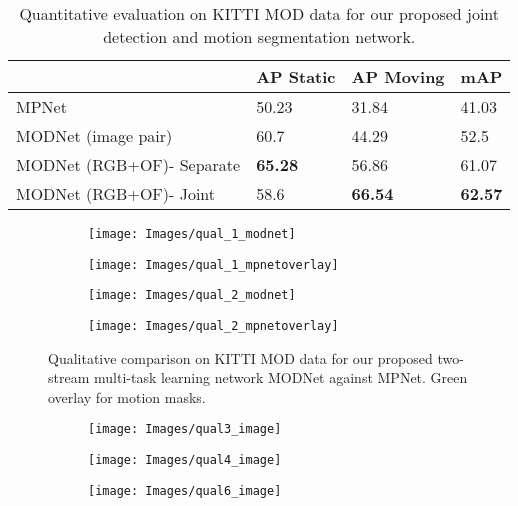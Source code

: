 \documentclass[letterpaper, 10 pt, conference]{ieeeconf}  %
\begin{document}
\begin{table}[ht!]
\centering
\caption{Quantitative evaluation on KITTI MOD data for our proposed joint detection and motion segmentation network.}
\begin{tabular}{|l|l|l|l|}
\hline
 & AP Static & AP Moving & mAP \\ \hline
MPNet\cite{tokmakov2016learning} & 50.23 & 31.84 & 41.03 \\ \hline
MODNet (image pair) & 60.7 & 44.29 & 52.5\\ \hline
MODNet (RGB+OF)- Separate& \textbf{65.28} & 56.86 & 61.07 \\ \hline
MODNet (RGB+OF)- Joint& 58.6 & \textbf{66.54} & \textbf{62.57} \\ \hline
\end{tabular}
\label{table:quant_det}
\end{table}\begin{figure*}[ht!]
\centering
\begin{subfigure}{.48\textwidth}
    \texttt{[image: Images/qual\_1\_modnet]}
\end{subfigure}%
\begin{subfigure}{.48\textwidth}
    \texttt{[image: Images/qual\_1\_mpnetoverlay]}
\end{subfigure}

\begin{subfigure}{.48\textwidth}
    \texttt{[image: Images/qual\_2\_modnet]}
\end{subfigure}%
\begin{subfigure}{.48\textwidth}
    \texttt{[image: Images/qual\_2\_mpnetoverlay]}
\end{subfigure}
    \caption{Qualitative comparison on KITTI MOD data for our proposed two-stream multi-task learning network MODNet against MPNet. Green overlay for motion masks.}
    \label{fig:qual_comp}
\end{figure*}\begin{figure*}[ht!]
\centering
\begin{subfigure}{.3\textwidth}
    \texttt{[image: Images/qual3\_image]}
\end{subfigure}%
\begin{subfigure}{.3\textwidth}
    \texttt{[image: Images/qual4\_image]}
\end{subfigure}%
\begin{subfigure}{.3\textwidth}
    \texttt{[image: Images/qual6\_image]}
\end{subfigure}


\end{figure*}
\end{document}
